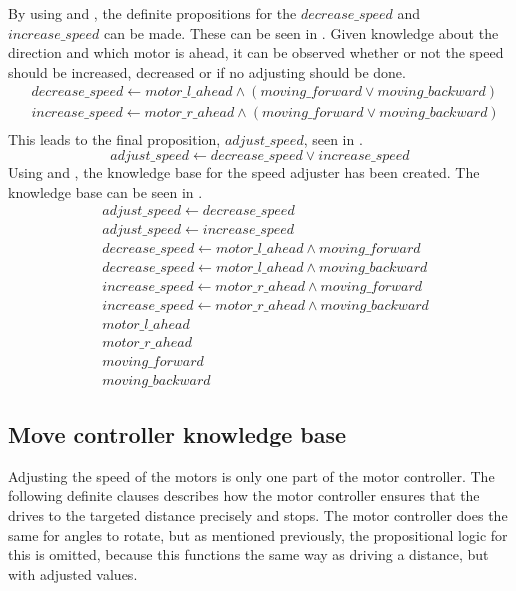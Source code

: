 By using  and , the definite propositions for the $decrease\_speed$ and $increase\_speed$ can be made. These can be seen in . Given knowledge about the direction and which motor is ahead, it can be observed whether or not the speed should be increased, decreased or if no adjusting should be done. 
\begin{equation} \label{eq:decrease-increase-speed}
\begin{split}
& decrease\_speed \leftarrow motor\_l\_ahead \land (moving\_forward \lor moving\_backward) \\
& increase\_speed \leftarrow motor\_r\_ahead \land (moving\_forward \lor moving\_backward) \\
\end{split}
\end{equation}
This leads to the final proposition, $adjust\_speed$, seen in . 
\begin{equation} \label{eq:adjust-speed}
adjust\_speed \leftarrow decrease\_speed \lor increase\_speed 
\end{equation}
Using  and , the knowledge base for the speed adjuster has been created. The knowledge base can be seen in . 
\begin{equation} \label{eq:knowledge-base-speed-adjuster}
\begin{split}
& adjust\_speed \leftarrow decrease\_speed \\
& adjust\_speed \leftarrow increase\_speed \\
& decrease\_speed \leftarrow motor\_l\_ahead \land moving\_forward \\
& decrease\_speed \leftarrow motor\_l\_ahead \land moving\_backward \\
& increase\_speed \leftarrow motor\_r\_ahead \land moving\_forward \\
& increase\_speed \leftarrow motor\_r\_ahead \land moving\_backward \\
& motor\_l\_ahead \\
& motor\_r\_ahead \\
& moving\_forward \\
& moving\_backward
\end{split}
\end{equation}


\subsection{Move controller knowledge base}
Adjusting the speed of the motors is only one part of the motor controller. The following definite clauses describes how the motor controller ensures that the \projname{} drives to the targeted distance precisely and stops. The motor controller does the same for angles to rotate, but as mentioned previously, the propositional logic for this is omitted, because this functions the same way as driving a distance, but with adjusted values.

